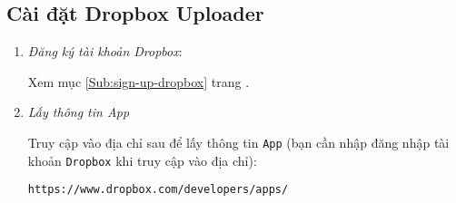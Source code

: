 \subsection{Cài đặt Dropbox Uploader}\label{Sub:Install-dropbox-uploader}
\begin{enumerate}[{\it a.}]
\item \textit{Đăng ký tài khoản Dropbox}:

Xem mục \ref{Sub:sign-up-dropbox} trang \pageref{Sub:sign-up-dropbox}.
\item \textit{Lấy thông tin App}

Truy cập vào địa chỉ sau để lấy thông tin \verb|App| (bạn cần nhập đăng nhập tài khoản \verb|Dropbox| khi truy cập vào địa chỉ):
\begin{center}
\verb|https://www.dropbox.com/developers/apps/|
\end{center}


\end{enumerate}
